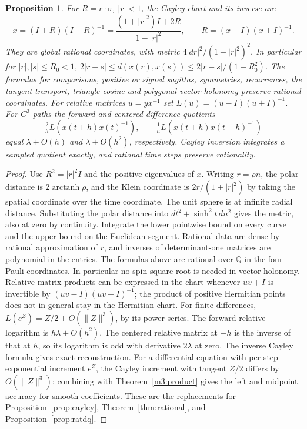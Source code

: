 \documentclass[11pt,reqno]{amsart}
\newtheorem{proposition}[theorem]{Proposition}
\theoremstyle{definition}
\theoremstyle{remark}
\numberwithin{equation}{section}
\newcommand{\Q}{\mathbb{Q}}
\begin{document}
\begin{proposition}\label{m3:charts}
For \(R=r\cdot\sigma\), \(|r|<1\), the Cayley chart and its inverse are
\[
 x=(I+R)(I-R)^{-1}=\frac{(1+|r|^2)I+2R}{1-|r|^2},
 \qquad R=(x-I)(x+I)^{-1}.
\]
They are global rational coordinates, with metric
\(4|dr|^2/(1-|r|^2)^2\). In particular for \(|r|,|s|\le R_0<1\),
\(2|r-s|\le d(x(r),x(s))\le 2|r-s|/(1-R_0^2)\).
The formulas for comparisons, positive or signed sagittas,
symmetries, recurrences, the tangent transport, triangle cosine
and polygonal vector holonomy preserve rational coordinates.
For relative matrices \(u=yx^{-1}\) set \(L(u)=(u-I)(u+I)^{-1}\).
For \(C^3\) paths the forward and centered difference quotients
\[
 \tfrac2h L(x(t+h)x(t)^{-1}),\qquad
 \tfrac1h L(x(t+h)x(t-h)^{-1})
\]
equal \(\lambda+O(h)\) and \(\lambda+O(h^2)\), respectively.
Cayley inversion integrates a sampled quotient exactly, and
rational time steps preserve rationality.
\end{proposition}
\begin{proof}
Use \(R^2=|r|^2I\) and the positive eigenvalues of \(x\).
Writing \(r=\rho n\), the polar distance is
\(2\operatorname{arctanh}\rho\), and the Klein coordinate is
\(2r/(1+|r|^2)\) by taking the spatial coordinate over the time
coordinate. The unit sphere is at infinite radial distance.
Substituting the polar distance into
\(dt^2+\sinh^2t\,dn^2\) gives the metric, also at zero by
continuity. Integrate the lower pointwise bound on every curve
and the upper bound on the Euclidean segment. Rational data
are dense by rational approximation of \(r\), and inverses of
determinant-one matrices are polynomial in the entries.
The formulas above are rational over \(\Q\) in the four Pauli
coordinates. In particular no spin square root is needed in
vector holonomy. Relative matrix products can be expressed in
the chart whenever \(uv+I\) is invertible by
\((uv-I)(uv+I)^{-1}\); the product of positive Hermitian points
does not in general stay in the Hermitian chart.
For finite differences, \(L(e^Z)=Z/2+O(\|Z\|^3)\), by its power
series. The forward relative logarithm is \(h\lambda+O(h^2)\).
The centered relative matrix at \(-h\) is the inverse of that
at \(h\), so its logarithm is odd with derivative \(2\lambda\)
at zero. The inverse Cayley formula gives exact reconstruction.
For a differential equation with per-step exponential increment
\(e^Z\), the Cayley increment with tangent \(Z/2\) differs by
\(O(\|Z\|^3)\); combining with Theorem~\ref{m3:product} gives
the left and midpoint accuracy for smooth coefficients.
These are the replacements for
Proposition~\ref{prop:cayley}, Theorem~\ref{thm:rational},
and Proposition~\ref{prop:ratdq}.
\end{proof}
\end{document}
